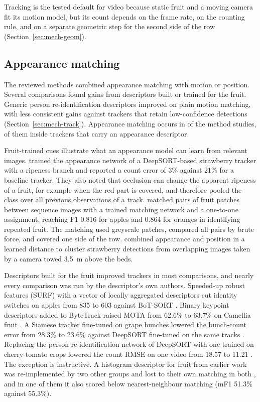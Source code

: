 Tracking is the tested default for video because static fruit and a moving camera fit its motion model, but its count depends on the frame rate, on the counting rule, and on a separate geometric step for the second side of the row (Section~\ref{sec:mech-geom}).

\subsection{Appearance matching}\label{sec:mech-app}
The reviewed methods combined appearance matching with motion or position. Several comparisons found gains from descriptors built or trained for the fruit. Generic person re-identification descriptors improved on plain motion matching, with less consistent gains against trackers that retain low-confidence detections (Section~\ref{sec:mech-track}). Appearance matching occurs in \nApp of the \nMethod method studies, \nAppTrack of them inside trackers that carry an appearance descriptor.

Fruit-trained cues illustrate what an appearance model can learn from relevant images. \citet{kirk2021robust} trained the appearance network of a DeepSORT-based strawberry tracker with a ripeness branch and reported a count error of 3\% against 21\% for a baseline tracker. They also noted that occlusion can change the apparent ripeness of a fruit, for example when the red part is covered, and therefore pooled the class over all previous observations of a track. \citet{xia2022culling} matched pairs of fruit patches between sequence images with a trained matching network and a one-to-one assignment, reaching F1 0.816 for apples and 0.864 for oranges in identifying repeated fruit. The matching used greyscale patches, compared all pairs by brute force, and covered one side of the row. \citet{zheng2023object} combined appearance and position in a learned distance to cluster strawberry detections from overlapping images taken by a camera towed 3.5~m above the beds.

Descriptors built for the fruit improved trackers in most comparisons, and nearly every comparison was run by the descriptor's own authors. Speeded-up robust features (SURF) with a vector of locally aggregated descriptors cut identity switches on apples from 835 to 603 against BoT-SORT \citep{yang2024automatic}. Binary keypoint descriptors added to ByteTrack raised MOTA from 62.6\% to 63.7\% on Camellia fruit \citep{dong2025fruit}. A Siamese tracker fine-tuned on grape bunches lowered the bunch-count error from 28.3\% to 23.6\% against DeepSORT fine-tuned on the same tracks \citep{ahmedtaristizabal2024field}. Replacing the person re-identification network of DeepSORT with one trained on cherry-tomato crops lowered the count RMSE on one video from 18.57 to 11.21 \citep{meng2024real}. The exception is instructive. A histogram descriptor for fruit from earlier work was re-implemented by two other groups and lost to their own matching in both \citep{fusaro2026horticultural,lei2025spatio}, and in one of them it also scored below nearest-neighbour matching (mF1 51.3\% against 55.3\%).

